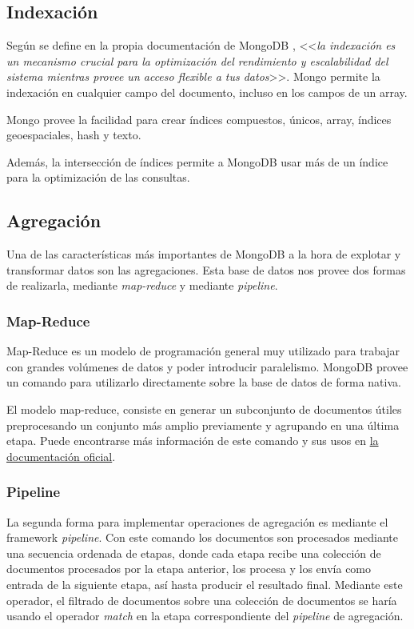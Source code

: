 \subsection{Indexación}

Según se define en la propia documentación de MongoDB \cite{mongodb}, <<\textit{la indexación es un mecanismo crucial para la optimización del rendimiento y escalabilidad del sistema mientras provee un acceso flexible a tus datos}>>. Mongo permite la indexación en cualquier campo del documento, incluso en los campos de un array.

Mongo provee la facilidad para crear índices compuestos, únicos, array, índices geoespaciales, hash y texto.

Además, la intersección de índices permite a MongoDB usar más de un índice para la optimización de las consultas.

\subsection{Agregación}

Una de las características más importantes de MongoDB a la hora de explotar y transformar datos son las agregaciones. Esta base de datos nos provee dos formas de realizarla, mediante \textit{map-reduce} y mediante \textit{pipeline}.

\subsubsection{Map-Reduce}\label{mapreduce}

Map-Reduce es un modelo de programación general muy utilizado para trabajar con grandes volúmenes de datos y poder introducir paralelismo. MongoDB provee un comando para utilizarlo directamente sobre la base de datos de forma nativa.

El modelo map-reduce, consiste en generar un subconjunto de documentos útiles preprocesando un conjunto más amplio previamente y agrupando en una última etapa. Puede encontrarse más información de este comando y sus usos en \href{https://docs.mongodb.com/manual/core/map-reduce/}{la documentación oficial}.

\subsubsection{Pipeline}\label{pipeline}

La segunda forma para implementar operaciones de agregación es mediante el framework \textit{pipeline}. Con este comando los documentos son procesados mediante una secuencia ordenada de etapas, donde cada etapa recibe una colección de documentos procesados por la etapa anterior, los procesa y los envía como entrada de la siguiente etapa, así hasta producir el resultado final. Mediante este operador, el filtrado de documentos sobre una colección de documentos se haría usando el operador \textit{match} en la etapa correspondiente del \textit{pipeline} de agregación.

